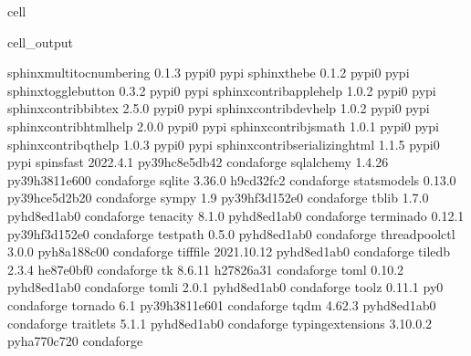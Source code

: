 \documentclass[letterpaper,table,10pt,english]{jupyterBook}
\begin{document}
\begin{sphinxuseclass}{cell}
\begin{sphinxVerbatimOutput}
\begin{sphinxuseclass}{cell_output}
\begin{sphinxVerbatim}[commandchars=\\\{\}]
sphinx\PYGZhy{}multitoc\PYGZhy{}numbering 0.1.3                    pypi\PYGZus{}0    pypi
sphinx\PYGZhy{}thebe              0.1.2                    pypi\PYGZus{}0    pypi
sphinx\PYGZhy{}togglebutton       0.3.2                    pypi\PYGZus{}0    pypi
sphinxcontrib\PYGZhy{}applehelp   1.0.2                    pypi\PYGZus{}0    pypi
sphinxcontrib\PYGZhy{}bibtex      2.5.0                    pypi\PYGZus{}0    pypi
sphinxcontrib\PYGZhy{}devhelp     1.0.2                    pypi\PYGZus{}0    pypi
sphinxcontrib\PYGZhy{}htmlhelp    2.0.0                    pypi\PYGZus{}0    pypi
sphinxcontrib\PYGZhy{}jsmath      1.0.1                    pypi\PYGZus{}0    pypi
sphinxcontrib\PYGZhy{}qthelp      1.0.3                    pypi\PYGZus{}0    pypi
sphinxcontrib\PYGZhy{}serializinghtml 1.1.5                    pypi\PYGZus{}0    pypi
spinsfast                 2022.4.1         py39hc8e5db4\PYGZus{}2    conda\PYGZhy{}forge
sqlalchemy                1.4.26           py39h3811e60\PYGZus{}0    conda\PYGZhy{}forge
sqlite                    3.36.0               h9cd32fc\PYGZus{}2    conda\PYGZhy{}forge
statsmodels               0.13.0           py39hce5d2b2\PYGZus{}0    conda\PYGZhy{}forge
sympy                     1.9              py39hf3d152e\PYGZus{}0    conda\PYGZhy{}forge
tblib                     1.7.0              pyhd8ed1ab\PYGZus{}0    conda\PYGZhy{}forge
tenacity                  8.1.0              pyhd8ed1ab\PYGZus{}0    conda\PYGZhy{}forge
terminado                 0.12.1           py39hf3d152e\PYGZus{}0    conda\PYGZhy{}forge
testpath                  0.5.0              pyhd8ed1ab\PYGZus{}0    conda\PYGZhy{}forge
threadpoolctl             3.0.0              pyh8a188c0\PYGZus{}0    conda\PYGZhy{}forge
tifffile                  2021.10.12         pyhd8ed1ab\PYGZus{}0    conda\PYGZhy{}forge
tiledb                    2.3.4                he87e0bf\PYGZus{}0    conda\PYGZhy{}forge
tk                        8.6.11               h27826a3\PYGZus{}1    conda\PYGZhy{}forge
toml                      0.10.2             pyhd8ed1ab\PYGZus{}0    conda\PYGZhy{}forge
tomli                     2.0.1              pyhd8ed1ab\PYGZus{}0    conda\PYGZhy{}forge
toolz                     0.11.1                     py\PYGZus{}0    conda\PYGZhy{}forge
tornado                   6.1              py39h3811e60\PYGZus{}1    conda\PYGZhy{}forge
tqdm                      4.62.3             pyhd8ed1ab\PYGZus{}0    conda\PYGZhy{}forge
traitlets                 5.1.1              pyhd8ed1ab\PYGZus{}0    conda\PYGZhy{}forge
typing\PYGZus{}extensions         3.10.0.2           pyha770c72\PYGZus{}0    conda\PYGZhy{}forge

\end{sphinxVerbatim}
\end{sphinxuseclass}
\end{sphinxVerbatimOutput}
\end{sphinxuseclass}
\end{document}
